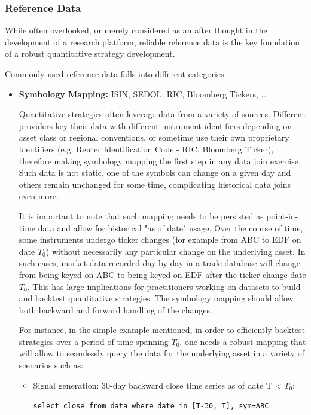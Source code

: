 \subsubsection{Reference Data}

While often overlooked, or merely considered as an after thought in the development of a research platform, reliable reference data is the key foundation of a robust quantitative strategy development.

Commonly used reference data falls into different categories:

\begin{itemize}
\item \textbf{Symbology Mapping:} ISIN, SEDOL, RIC, Bloomberg Tickers, ... 

Quantitative strategies often leverage data from a variety of sources. Different providers key their data with different instrument identifiers depending on asset class or regional conventions, or sometime use their own proprietary identifiers (e.g. Reuter Identification Code - RIC, Bloomberg Ticker), therefore making symbology mapping the first step in any data join exercise. Such data is not static, one of the symbols can change on a given day and others remain unchanged for some time, complicating historical data joins even more.

It is important to note that such mapping needs to be persisted as point-in-time data and allow for historical "as of date" usage. Over the course of time, some instruments undergo ticker changes (for example from ABC to EDF on date $T_0$) without necessarily any particular change on the underlying asset. In such cases, market data recorded day-by-day in a trade database will change from being keyed on ABC to being keyed on EDF after the ticker change date $T_0$. This has large implications for practitioners working on datasets to build and backtest quantitative strategies. The symbology mapping should allow both backward and forward handling of the changes.

For instance, in the simple example mentioned, in order to efficiently backtest strategies over a period of time spanning $T_0$, one needs a robust mapping that will allow to seamlessly query the data for the underlying asset in a variety of scenarios such as:

\begin{itemize}
\item Signal generation: 30-day backward close time series as of date T < $T_0$:

{\tt select close from data where date in [T-30,  T], sym=ABC}


\end{itemize}
\end{itemize}
